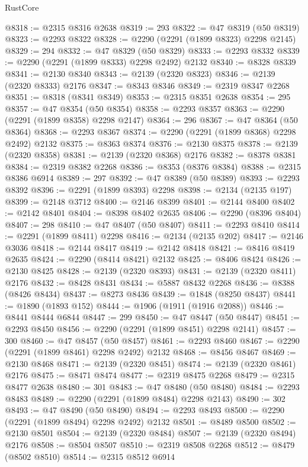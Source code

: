 \begin{lexlean}{RustCore}
\begin{coremodule}
@8318 := @2315 @8316 @2638
@8319 := 293
@8322 := @47 @8319 (@50 @8319)
@8323 := @2293 @8322
@8328 := @2290 (@2291 (@1899 @8323) @2298 @2145)
@8329 := 294
@8332 := @47 @8329 (@50 @8329)
@8333 := @2293 @8332
@8339 := @2290 (@2291 (@1899 @8333) @2298 @2492) @2132
@8340 := @8328 @8339
@8341 := @2130 @8340
@8343 := @2139 (@2320 @8323)
@8346 := @2139 (@2320 @8333) @2176
@8347 := @8343 @8346
@8349 := @2319 @8347 @2268
@8351 := @8318 (@8341 @8349)
@8353 := @2315 @8351 @2638
@8354 := 295
@8357 := @47 @8354 (@50 @8354)
@8358 := @2293 @8357
@8363 := @2290 (@2291 (@1899 @8358) @2298 @2147)
@8364 := 296
@8367 := @47 @8364 (@50 @8364)
@8368 := @2293 @8367
@8374 := @2290 (@2291 (@1899 @8368) @2298 @2492) @2132
@8375 := @8363 @8374
@8376 := @2130 @8375
@8378 := @2139 (@2320 @8358)
@8381 := @2139 (@2320 @8368) @2176
@8382 := @8378 @8381
@8384 := @2319 @8382 @2268
@8386 := @8353 (@8376 @8384)
@8388 := @2315 @8386 @6914
@8389 := 297
@8392 := @47 @8389 (@50 @8389)
@8393 := @2293 @8392
@8396 := @2291 (@1899 @8393) @2298
@8398 := @2134 (@2135 @197)
@8399 := @2148 @3712
@8400 := @2146 @8399
@8401 := @2144 @8400
@8402 := @2142 @8401
@8404 := @8398 @8402 @2635
@8406 := @2290 (@8396 @8404)
@8407 := 298
@8410 := @47 @8407 (@50 @8407)
@8411 := @2293 @8410
@8414 := @2291 (@1899 @8411) @2298
@8416 := @2134 (@2135 @202)
@8417 := @2146 @3036
@8418 := @2144 @8417
@8419 := @2142 @8418
@8421 := @8416 @8419 @2635
@8424 := @2290 (@8414 @8421) @2132
@8425 := @8406 @8424
@8426 := @2130 @8425
@8428 := @2139 (@2320 @8393)
@8431 := @2139 (@2320 @8411) @2176
@8432 := @8428 @8431
@8434 := @5887 @8432 @2268
@8436 := @8388 (@8426 @8434)
@8437 := @8273 @8436
@8439 := @1848 (@8250 @8437)
@8441 := @1890 (@1893 @152)
@8444 := @1906 (@1911 (@1916 @2088))
@8446 := @8441 @8444 @6844
@8447 := 299
@8450 := @47 @8447 (@50 @8447)
@8451 := @2293 @8450
@8456 := @2290 (@2291 (@1899 @8451) @2298 @2141)
@8457 := 300
@8460 := @47 @8457 (@50 @8457)
@8461 := @2293 @8460
@8467 := @2290 (@2291 (@1899 @8461) @2298 @2492) @2132
@8468 := @8456 @8467
@8469 := @2130 @8468
@8471 := @2139 (@2320 @8451)
@8474 := @2139 (@2320 @8461) @2176
@8475 := @8471 @8474
@8477 := @2319 @8475 @2268
@8479 := @2315 @8477 @2638
@8480 := 301
@8483 := @47 @8480 (@50 @8480)
@8484 := @2293 @8483
@8489 := @2290 (@2291 (@1899 @8484) @2298 @2143)
@8490 := 302
@8493 := @47 @8490 (@50 @8490)
@8494 := @2293 @8493
@8500 := @2290 (@2291 (@1899 @8494) @2298 @2492) @2132
@8501 := @8489 @8500
@8502 := @2130 @8501
@8504 := @2139 (@2320 @8484)
@8507 := @2139 (@2320 @8494) @2176
@8508 := @8504 @8507
@8510 := @2319 @8508 @2268
@8512 := @8479 (@8502 @8510)
@8514 := @2315 @8512 @6914

\end{coremodule}
\end{lexlean}
